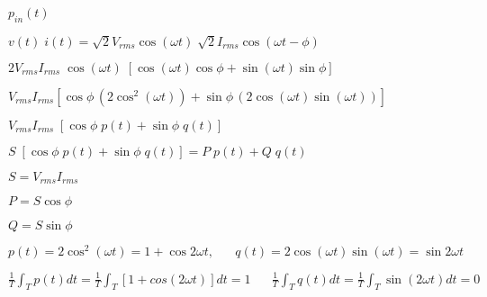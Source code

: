 \documentclass{article}
\def\lthtmlcheckvsize{\ifdim\ht\sizebox<\vsize 
  \ifdim\wd\sizebox<\hsize\expandafter\hfill\fi \expandafter\vfill
  \else\expandafter\vss\fi}%
\begin{document}
{\newpage\clearpage
{}%
$\displaystyle p_{in}(t)$%
\lthtmlindisplaymathZ
\lthtmlcheckvsize\clearpage}

{\newpage\clearpage
{}%
$\displaystyle v(t)\;i(t)=\sqrt{2}V_{rms}\cos(\omega t)\;\sqrt{2}I_{rms}\cos(\omega t-\phi)$%
\lthtmlindisplaymathZ
\lthtmlcheckvsize\clearpage}

{\newpage\clearpage
{}%
$\displaystyle 2V_{rms}I_{rms}\;\cos(\omega t)\;[\cos(\omega t)\cos\phi
+\sin(\omega t)\sin\phi ]$%
\lthtmlindisplaymathZ
\lthtmlcheckvsize\clearpage}

{\newpage\clearpage
{}%
$\displaystyle V_{rms}I_{rms} \left[\cos\phi\, \left(2\cos^2(\omega t)\right)
+\sin\phi\,\left(2\cos(\omega t)\sin(\omega t)\right) \right]$%
\lthtmlindisplaymathZ
\lthtmlcheckvsize\clearpage}

{\newpage\clearpage
{}%
$\displaystyle V_{rms}I_{rms} \;\left[ \cos\phi\; p(t) + \sin\phi\; q(t) \right]$%
\lthtmlindisplaymathZ
\lthtmlcheckvsize\clearpage}

{\newpage\clearpage
{}%
$\displaystyle S \;\left[\cos\phi\; p(t) + \sin\phi\; q(t) \right]
=P\; p(t)+Q\; q(t)$%
\lthtmlindisplaymathZ
\lthtmlcheckvsize\clearpage}

{\newpage\clearpage
{}%
$ S=V_{rms}I_{rms}$%
\lthtmlindisplaymathZ
\lthtmlcheckvsize\clearpage}

{\newpage\clearpage
{}%
$ P=S\cos\phi$%
\lthtmlindisplaymathZ
\lthtmlcheckvsize\clearpage}

{\newpage\clearpage
{}%
$ Q=S\sin\phi$%
\lthtmlindisplaymathZ
\lthtmlcheckvsize\clearpage}

{\newpage\clearpage
{}%
$\displaystyle p(t)=2\cos^2(\omega t)=1+\cos 2\omega t,\;\;\;\;\;\;
q(t)=2\cos(\omega t)\sin(\omega t)=\sin 2\omega t$%
\lthtmlindisplaymathZ
\lthtmlcheckvsize\clearpage}

{\newpage\clearpage
{}%
$\displaystyle \frac{1}{T}\int_T p(t)dt=\frac{1}{T}\int_T [1+cos(2\omega t)] dt=1
\;\;\;\;\;\;
\frac{1}{T}\int_T q(t)dt=\frac{1}{T}\int_T \sin(2\omega t) dt=0$%
\lthtmlindisplaymathZ
\lthtmlcheckvsize\clearpage}
\end{document}
